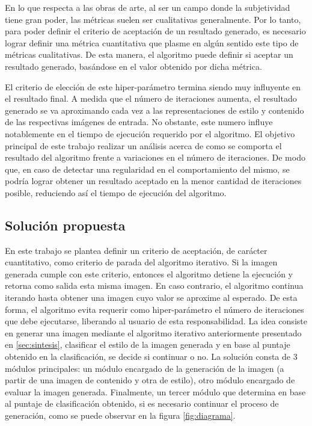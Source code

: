 \documentclass[a4paper,11pt,spanish]{book}
\begin{document}
      En lo que respecta a las obras de arte, al ser un campo donde la subjetividad tiene gran poder, las métricas suelen ser cualitativas generalmente. 
      Por lo tanto, para poder definir el criterio de aceptación de un resultado generado, es necesario lograr definir una métrica cuantitativa que plasme en algún sentido este tipo de 
      métricas cualitativas. De esta manera, el algoritmo puede definir si aceptar un resultado generado, basándose en el valor obtenido por dicha métrica.
      
      El criterio de elección de este hiper-parámetro termina siendo muy influyente en el resultado final. A medida que el número de iteraciones
      aumenta, el resultado generado se va aproximando cada vez a las representaciones de estilo y contenido de las respectivas imágenes de entrada. 
      No obstante, este numero influye notablemente en el tiempo de ejecución requerido por el algoritmo. 
      El objetivo principal de este trabajo realizar un análisis acerca de como se comporta el resultado del algoritmo frente a variaciones en el número de iteraciones. 
      De modo que, en caso de detectar una regularidad en el comportamiento del mismo, se podría lograr obtener un resultado aceptado en la menor cantidad de iteraciones 
      posible, reduciendo así el tiempo de ejecución del algoritmo.

    \subsection{Solución propuesta} \label{sec:solucion}
      En este trabajo se plantea definir un criterio de aceptación, de carácter cuantitativo, como criterio de parada del algoritmo iterativo. 
      Si la imagen generada cumple con este criterio, entonces el algoritmo detiene la ejecución y retorna como salida esta misma imagen. 
      En caso contrario, el algoritmo continua iterando hasta obtener una imagen cuyo valor se aproxime al esperado.
      De esta forma, el algoritmo evita requerir como hiper-parámetro el número de iteraciones que debe ejecutarse, liberando al usuario de esta responsabilidad.
      La idea consiste en generar una imagen mediante el algoritmo iterativo anteriormente presentado en \ref{sec:sintesis}, clasificar el estilo de la imagen 
      generada y en base al puntaje obtenido en la clasificación, se decide si continuar o no.
      La solución consta de 3 módulos principales: un módulo encargado de la generación de la imagen (a partir de una imagen de contenido y otra de estilo), otro módulo 
      encargado de evaluar la imagen generada. Finalmente, un tercer módulo que determina en base al puntaje de clasificación obtenido, si es necesario continuar el 
      proceso de generación, como se puede observar en la figura \ref{fig:diagrama}.
\end{document}
